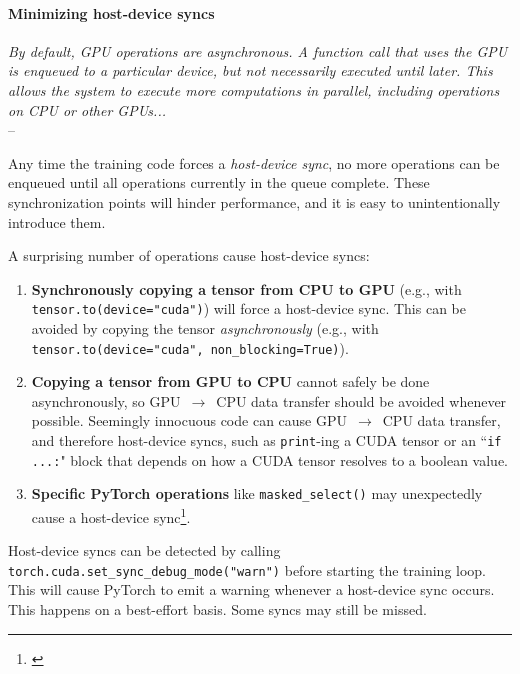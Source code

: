 \documentclass[table]{ai2style/ai2}
\begin{document}
\paragraph{Minimizing host-device syncs}

\begin{displayquote}
    \textit{By default, GPU operations are asynchronous. A function call that uses the GPU is enqueued to a particular device, but not necessarily executed until later. This allows the system to execute more computations in parallel, including operations on CPU or other GPUs...} \\
    -- 
\end{displayquote}

Any time the training code forces a \textit{host-device sync}, no more operations can be enqueued until all operations currently in the queue complete.
These synchronization points will hinder performance, and it is easy to unintentionally introduce them.

A surprising number of operations cause host-device syncs:\nopagebreak
\begin{enumerate}
    \item 
    {\bf{Synchronously copying a tensor from CPU to GPU}}
    (e.g., with \texttt{tensor.to}\texttt{(device="cuda")}) will force a host-device sync.
    This can be avoided by copying the tensor \textit{asynchronously}
    (e.g., with \texttt{tensor.to}\texttt{(device="cuda",}~\texttt{non\_blocking=True)}).
    
    \item
    {\bf{Copying a tensor from GPU to CPU}} cannot safely be done asynchronously, so GPU~$\rightarrow$~CPU data transfer should be avoided whenever possible.
    Seemingly innocuous code can cause GPU~$\rightarrow$~CPU data transfer, and therefore host-device syncs, such as \texttt{print}-ing a CUDA tensor or an ``\texttt{if ...:}" block that depends on how a CUDA tensor resolves to a boolean value.
    
    \item
    {\bf{Specific PyTorch operations}} like \texttt{masked\_select()} may unexpectedly cause a host-device sync\footnote{\href{https://github.com/pytorch/pytorch/issues/12461}{}}.
\end{enumerate}

Host-device syncs can be detected by calling \texttt{torch.cuda.set\_sync\_debug\_mode("warn")} before starting the training loop.
This will cause PyTorch to emit a warning whenever a host-device sync occurs.
This happens on a best-effort basis.
Some syncs may still be missed.
\end{document}
